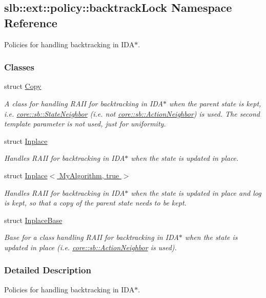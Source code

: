 \hypertarget{namespaceslb_1_1ext_1_1policy_1_1backtrackLock}{}\subsection{slb\+:\+:ext\+:\+:policy\+:\+:backtrack\+Lock Namespace Reference}
\label{namespaceslb_1_1ext_1_1policy_1_1backtrackLock}


Policies for handling backtracking in I\+D\+A$\ast$.  


\subsubsection*{Classes}
\begin{DoxyCompactItemize}
\item 
struct \hyperlink{structslb_1_1ext_1_1policy_1_1backtrackLock_1_1Copy}{Copy}
\begin{DoxyCompactList}\small\item\em A class for handling R\+A\+II for backtracking in I\+D\+A$\ast$ when the parent state is kept, i.\+e. \hyperlink{structslb_1_1core_1_1sb_1_1StateNeighbor}{core\+::sb\+::\+State\+Neighbor} (i.\+e. not \hyperlink{structslb_1_1core_1_1sb_1_1ActionNeighbor}{core\+::sb\+::\+Action\+Neighbor}) is used. The second template parameter is not used, just for uniformity. \end{DoxyCompactList}\item 
struct \hyperlink{structslb_1_1ext_1_1policy_1_1backtrackLock_1_1Inplace}{Inplace}
\begin{DoxyCompactList}\small\item\em Handles R\+A\+II for backtracking in I\+D\+A$\ast$ when the state is updated in place. \end{DoxyCompactList}\item 
struct \hyperlink{structslb_1_1ext_1_1policy_1_1backtrackLock_1_1Inplace_3_01MyAlgorithm_00_01true_01_4}{Inplace$<$ My\+Algorithm, true $>$}
\begin{DoxyCompactList}\small\item\em Handles R\+A\+II for backtracking in I\+D\+A$\ast$ when the state is updated in place and log is kept, so that a copy of the parent state needs to be kept. \end{DoxyCompactList}\item 
struct \hyperlink{structslb_1_1ext_1_1policy_1_1backtrackLock_1_1InplaceBase}{Inplace\+Base}
\begin{DoxyCompactList}\small\item\em Base for a class handling R\+A\+II for backtracking in I\+D\+A$\ast$ when the state is updated in place (i.\+e. \hyperlink{structslb_1_1core_1_1sb_1_1ActionNeighbor}{core\+::sb\+::\+Action\+Neighbor} is used). \end{DoxyCompactList}\end{DoxyCompactItemize}


\subsubsection{Detailed Description}
Policies for handling backtracking in I\+D\+A$\ast$. 
